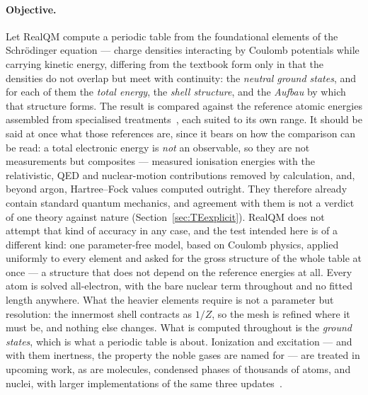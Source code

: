 \documentclass[11pt]{article}
\begin{document}
\paragraph{Objective.} Let RealQM compute a periodic table from the foundational elements of the
Schr\"odinger equation --- charge densities interacting by Coulomb potentials while carrying kinetic
energy, differing from the textbook form only in that the densities do not overlap but meet with
continuity: the \emph{neutral
ground states}, and for each of them the \emph{total energy}, the \emph{shell structure}, and
the \emph{Aufbau} by which that structure forms. The result is compared
against the reference atomic energies assembled from specialised
treatments~\cite{SzaboOstlund,ClementiRoetti,Chakravorty,Desclaux,HK64,KS65,Beck2000,NIST-ASD},
each suited to its own range. It should be said at once what those references are, since it
bears on how the comparison can be read: a total electronic energy is \emph{not} an observable,
so they are not measurements but composites --- measured ionisation energies with the
relativistic, QED and nuclear-motion contributions removed by calculation, and, beyond argon,
Hartree--Fock values computed outright. They therefore already contain standard quantum
mechanics, and agreement with them is not a verdict of one theory against nature
(Section~\ref{sec:TEexplicit}). RealQM does not attempt that kind of accuracy in any case, and
the test intended here is of a different kind: one parameter-free model, based on Coulomb
physics, applied uniformly to every element and asked for the gross structure of the whole table
at once --- a structure that does not depend on the reference energies at all. Every atom is
solved all-electron, with the bare nuclear term throughout and no fitted length anywhere. What
the heavier elements require is not a parameter but resolution: the innermost shell contracts
as $1/Z$, so the mesh is refined where it must be, and nothing else changes. What is computed throughout is the
\emph{ground states}, which is what a periodic table is about. Ionization and excitation --- and with
them inertness, the property the noble gases are named for --- are treated in upcoming work, as are molecules, condensed phases of thousands of atoms, and nuclei, with
larger implementations of the same three updates~\cite{Johnson-RealQM}.
\end{document}
